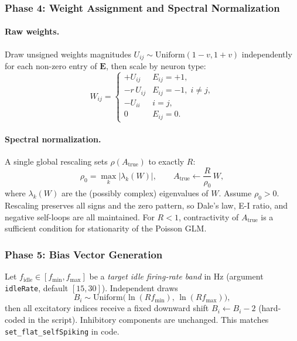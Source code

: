 \documentclass[11pt]{article}
\begin{document}
\subsubsection{Phase 4: Weight Assignment and Spectral Normalization}

\paragraph{Raw weights.}
Draw unsigned weights magnitudes
$U_{ij}\sim\mathrm{Uniform}(1-v,1+v)$ independently for each
non-zero entry of $\mathbf{E}$, then scale by neuron type:
\begin{equation}
  W_{ij}=
  \begin{cases}
    +U_{ij}    & E_{ij}=+1,\\
    -r\,U_{ij} & E_{ij}=-1,\;i\neq j,\\
    -U_{ii}    & i=j,\\
    0           & E_{ij}=0.
  \end{cases}
  \label{eq:weights}
\end{equation}

\paragraph{Spectral normalization.}
A single global rescaling sets $\rho(A_{\text{true}})$ to exactly $R$:
\begin{equation}
  \rho_0=\max_k|\lambda_k(W)|,\qquad
  A_{\text{true}}\leftarrow\frac{R}{\rho_0}\,W,
  \label{eq:spectral}
\end{equation}
where $\lambda_k(W)$ are the (possibly complex) eigenvalues of $W$.
Assume $\rho_0>0$.
Rescaling preserves all signs and the zero pattern, so Dale's law,
E-I ratio, and negative self-loops are all maintained.
For $R<1$, contractivity of $A_{\text{true}}$ is a sufficient
condition for stationarity of the Poisson GLM.

\subsubsection{Phase 5: Bias Vector Generation}

Let $f_{\mathrm{idle}}\in[f_{\min},f_{\max}]$ be a \emph{target idle
firing-rate band} in Hz (argument \texttt{idleRate}, default
$[15,30]$).  Independent draws
\begin{equation}
  B_i \sim \mathrm{Uniform}\bigl(\ln(R f_{\min}),\,\ln(R f_{\max})\bigr),
  \label{eq:bias}
\end{equation}
then all excitatory indices receive a fixed downward shift
$B_i\leftarrow B_i-2$ (hard-coded in the script).  Inhibitory
components are unchanged.  This matches \texttt{set\_flat\_selfSpiking}
in code.
\end{document}
